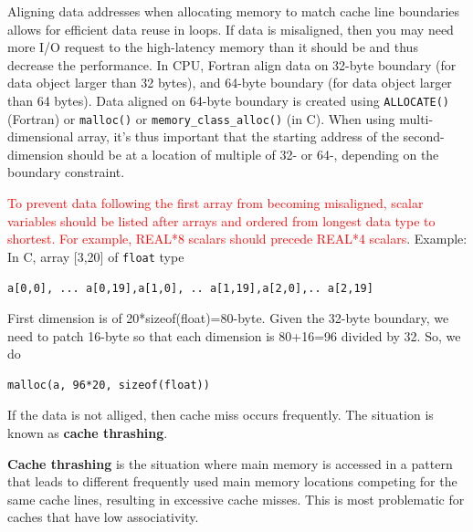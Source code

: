 Aligning data addresses when allocating memory to match cache line boundaries
allows for efficient data reuse in loops. If data is misaligned, then you may
need more I/O request to the high-latency memory than it should be and thus
decrease the performance.  In CPU, Fortran align data on 32-byte boundary (for
data object larger than 32 bytes), and 64-byte boundary (for data object larger
than 64 bytes). Data aligned on 64-byte boundary is created using
\verb!ALLOCATE()! (Fortran) or \verb!malloc()! or \verb!memory_class_alloc()!
(in C). When using multi-dimensional array, it's thus important that the
starting address of the second-dimension should be at a location of multiple of
32- or 64-, depending on the boundary constraint.

\textcolor{red}{To prevent data following the first array from becoming
  misaligned, scalar variables should be listed after arrays and ordered
  from longest data type to shortest. For example, REAL*8 scalars should
  precede REAL*4 scalars}. Example: In C, array [3,20] of \verb!float! type
\begin{verbatim}
a[0,0], ... a[0,19],a[1,0], .. a[1,19],a[2,0],.. a[2,19]
\end{verbatim}
First dimension is of 20*sizeof(float)=80-byte. Given the 32-byte boundary, we
need to patch 16-byte so that each dimension is 80+16=96 divided by 32. So, we
do
\begin{verbatim}
malloc(a, 96*20, sizeof(float))
\end{verbatim}
If the data is not alliged, then cache miss occurs frequently. The situation is
known as {\bf cache thrashing}.

{\bf Cache thrashing} is the situation where main memory is accessed
in a pattern that leads to different frequently used main memory
locations competing for the same cache lines, resulting in excessive
cache misses. This is most problematic for caches that have low
associativity. 

